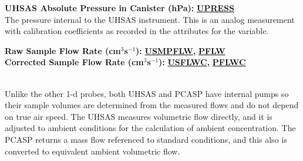 \begin{hangparagraphs}
\textbf{UHSAS Absolute Pressure in Canister (hPa):}\hypertarget{UPRESS}{}\textbf{
}\textbf{\uline{UPRESS}}\\
The pressure internal to the UHSAS instrument. This is an analog measurement
with calibration coefficients as recorded in the attributes for the
variable.\label{punch:7-2}

\noindent\begin{minipage}[t]{1\columnwidth}%
\textbf{Raw Sample Flow Rate (cm$^{3}$s$^{-1}$):}\hypertarget{USMPFLW}{}\hypertarget{PFLW}{}\textbf{
}\textbf{\uline{USMPFLW}}\textbf{, }\textbf{\uline{PFLW}}\\
\textbf{Corrected Sample Flow Rate (cm$^{3}$s$^{-1}$):}\hypertarget{USFLWC}{}\hypertarget{PFLWC}{}\textbf{
}\textbf{\uline{USFLWC}}\textbf{, }\textbf{\uline{PFLWC}}%
\end{minipage}\\
Unlike the other 1-d probes, both UHSAS and PCASP have internal pumps
so their sample volumes are determined from the measured flows and
do not depend on true air speed. The UHSAS measures volumetric flow
directly, and it is adjusted to ambient conditions for the calculation
of ambient concentration. The PCASP returns a mass
flow referenced to standard conditions, and this also is converted
to equivalent ambient volumetric flow.\\
\\
\end{hangparagraphs}
